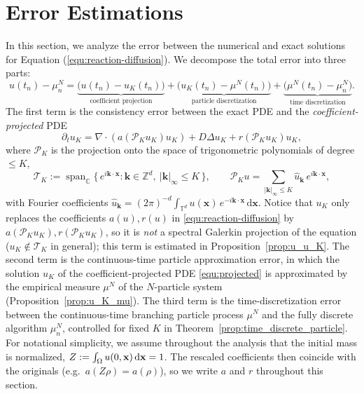 \documentclass[a4paper,fleqn]{cas-sc}
\newcommand{\mhyphen}{\text{-}}
\theoremstyle{definition}
\theoremstyle{remark}
\begin{document}
\section{Error Estimations}
In this section, we analyze the error between the numerical and exact solutions for Equation (\ref{equ:reaction-diffusion}). 
We decompose the total error into three parts:
\begin{equation}\label{eq:err-decomp}
u(t_n)-\mu^N_n
=\underbrace{\bigl(u(t_n)-u_K(t_n)\bigr)}_{\text{coefficient projection}}
+\underbrace{\bigl(u_K(t_n)-\mu^N(t_n)\bigr)}_{\text{particle discretization}}
+\underbrace{\bigl(\mu^N(t_n)-\mu^N_n\bigr)}_{\text{time discretization}}.
\end{equation}
The first term is the consistency error between the exact PDE and the
\emph{coefficient-projected} PDE
\begin{equation}\label{equ:projected}
    \partial_t u_K  = \nabla \cdot \left( a (\mathcal P_K u_K) u_K\right) + D \Delta u_K  + r\left(\mathcal P_K u_K\right)  u_K,
\end{equation}
where $\mathcal P_K$ is the projection onto the space of trigonometric
polynomials of degree $\le K$,
\[
  \mathcal T_K
  := \operatorname{span}_{\mathbb C}
     \bigl\{\, e^{i\mathbf k\cdot\mathbf x} : \mathbf k\in\mathbb Z^d,\ |\mathbf k|_\infty\le K \,\bigr\},
  \qquad
  \mathcal P_K u = \sum_{|\mathbf k|_\infty\le K}\hat u_{\mathbf k}\,e^{i\mathbf k\cdot\mathbf x},
\]
with Fourier coefficients
$\hat u_{\mathbf k}=(2\pi)^{-d}\int_{\mathbb T^d}u(\mathbf x)\,e^{-i\mathbf k\cdot\mathbf x}\,\mathrm d\mathbf x$.
Notice that $u_K$ only replaces the coefficients $a(u),r(u)$ in
\eqref{equ:reaction-diffusion} by $a(\mathcal P_K u_K),r(\mathcal P_K u_K)$, so it
is \emph{not} a spectral Galerkin projection of the equation
($u_K\notin\mathcal T_K$ in general); this term is estimated in
Proposition~\ref{prop:u_u_K}.
The second term is the continuous-time particle approximation error, in which the
solution $u_K$ of the coefficient-projected PDE \eqref{equ:projected} is
approximated by the empirical measure $\mu^N$ of the $N\mhyphen$particle system
(Proposition~\ref{prop:u_K_mu}).
The third term is the time-discretization error between the continuous-time
branching particle process $\mu^N$ and the fully discrete algorithm $\mu^N_n$,
controlled for fixed $K$ in Theorem~\ref{prop:time_discrete_particle}.
For notational simplicity, we assume throughout the analysis that the initial
mass is normalized, $Z:=\int_\Omega u(0,\mathbf{x})\,\mathrm{d}\mathbf{x}=1$. The rescaled
coefficients then coincide with the originals (e.g.\ $a(Z\rho)=a(\rho)$), so we
write $a$ and $r$ throughout this section.
\end{document}
